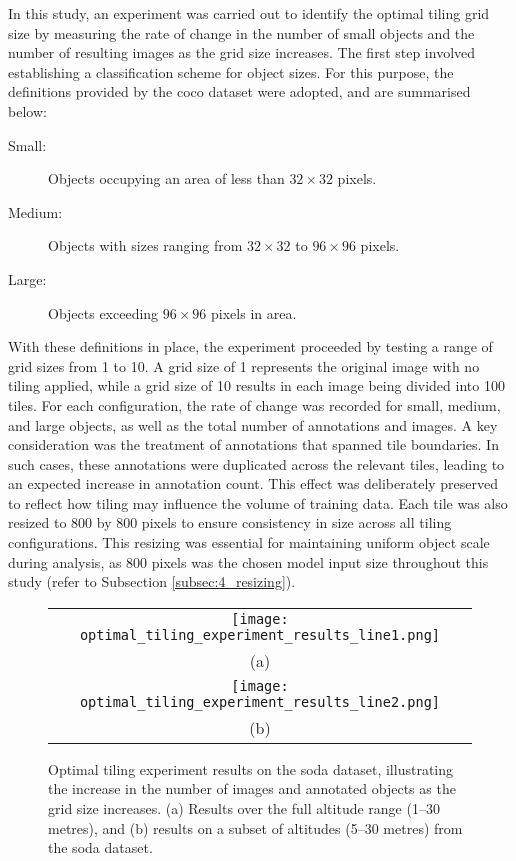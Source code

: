 In this study, an experiment was carried out to identify the optimal tiling grid size by measuring the rate of change in the number of small objects and the number of resulting images as the grid size increases. The first step involved establishing a classification scheme for object sizes. For this purpose, the definitions provided by the \gls{coco} dataset \cite{coco} were adopted, and are summarised below:

\begin{adjustwidth}{4em}{0pt} %
\begin{description}
    \item[Small:] Objects occupying an area of less than $32 \times 32$ pixels.
    \item[Medium:] Objects with sizes ranging from $32 \times 32$ to $96 \times 96$ pixels.
    \item[Large:] Objects exceeding $96 \times 96$ pixels in area.
\end{description}
\end{adjustwidth}

With these definitions in place, the experiment proceeded by testing a range of grid sizes from 1 to 10. A grid size of 1 represents the original image with no tiling applied, while a grid size of 10 results in each image being divided into 100 tiles. For each configuration, the rate of change was recorded for small, medium, and large objects, as well as the total number of annotations and images.
A key consideration was the treatment of annotations that spanned tile boundaries. In such cases, these annotations were duplicated across the relevant tiles, leading to an expected increase in annotation count. This effect was deliberately preserved to reflect how tiling may influence the volume of training data. Each tile was also resized to 800 by 800 pixels to ensure consistency in size across all tiling configurations. This resizing was essential for maintaining uniform object scale during analysis, as 800 pixels was the chosen model input size throughout this study (refer to Subsection \ref{subsec:4_resizing}).

\begin{figure}[!ht]
  \centering
  \begin{tabular}{c}
    \texttt{[image: optimal\_tiling\_experiment\_results\_line1.png]} \\
    \small (a) \\
    \addlinespace[1em]
    \texttt{[image: optimal\_tiling\_experiment\_results\_line2.png]} \\
    \small (b) \\
  \end{tabular}
  \caption{Optimal tiling experiment results on the \gls{soda} dataset, illustrating the increase in the number of images and annotated objects as the grid size increases. (a) Results over the full altitude range (1--30 metres), and (b) results on a subset of altitudes (5--30 metres) from the \gls{soda} dataset.}
  \label{fig:optimal_tiling_line}
\end{figure}

